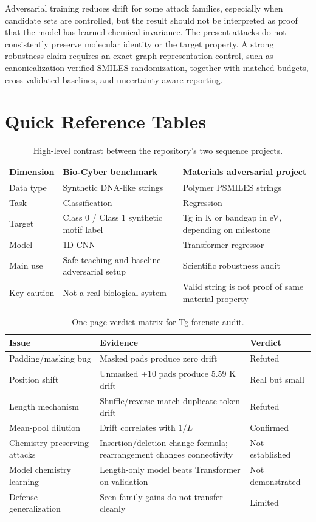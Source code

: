 \documentclass[11pt]{article}
\begin{document}
Adversarial training reduces drift for some attack families, especially when
candidate sets are controlled, but the result should not be interpreted as
proof that the model has learned chemical invariance. The present attacks do
not consistently preserve molecular identity or the target property. A strong
robustness claim requires an exact-graph representation control, such as
canonicalization-verified SMILES randomization, together with matched budgets,
cross-validated baselines, and uncertainty-aware reporting.

\appendix
\section{Quick Reference Tables}

\begin{table}[H]
\centering
\caption{High-level contrast between the repository's two sequence projects.}
\begin{tabularx}{\textwidth}{@{}lXX@{}}
\toprule
Dimension & Bio-Cyber benchmark & Materials adversarial project \\
\midrule
Data type & Synthetic DNA-like strings & Polymer PSMILES strings \\
Task & Classification & Regression \\
Target & Class 0 / Class 1 synthetic motif label & Tg in K or bandgap in eV, depending on milestone \\
Model & 1D CNN & Transformer regressor \\
Main use & Safe teaching and baseline adversarial setup & Scientific robustness audit \\
Key caution & Not a real biological system & Valid string is not proof of same material property \\
\bottomrule
\end{tabularx}
\end{table}

\begin{table}[H]
\centering
\caption{One-page verdict matrix for Tg forensic audit.}
\begin{tabularx}{\textwidth}{@{}lXl@{}}
\toprule
Issue & Evidence & Verdict \\
\midrule
Padding/masking bug & Masked pads produce zero drift & Refuted \\
Position shift & Unmasked +10 pads produce 5.59 K drift & Real but small \\
Length mechanism & Shuffle/reverse match duplicate-token drift & Refuted \\
Mean-pool dilution & Drift correlates with $1/L$ & Confirmed \\
Chemistry-preserving attacks & Insertion/deletion change formula; rearrangement changes connectivity & Not established \\
Model chemistry learning & Length-only model beats Transformer on validation & Not demonstrated \\
Defense generalization & Seen-family gains do not transfer cleanly & Limited \\
\bottomrule
\end{tabularx}
\end{table}
\end{document}
